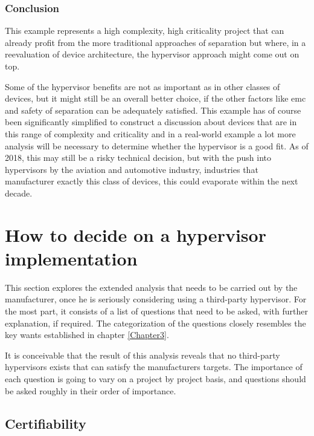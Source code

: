 \subsubsection{Conclusion}
This example represents a high complexity, high criticality project that can already profit from the more traditional approaches of separation but where, in a reevaluation of device architecture, the hypervisor approach might come out on top. 

Some of the hypervisor benefits are not as important as in other classes of devices, but it might still be an overall better choice, if the other factors like \acrshort{emc} and safety of separation can be adequately satisfied. This example has of course been significantly simplified to construct a discussion about devices that are in this range of complexity and criticality and in a real-world example a lot more analysis will be necessary to determine whether the hypervisor is a good fit. As of 2018, this may still be a risky technical decision, but with the push into hypervisors by the aviation and automotive industry, industries that manufacturer exactly this class of devices, this could evaporate within the next decade.


\section{How to decide on a hypervisor implementation} \label{how-to-decide}
This section explores the extended analysis that needs to be carried out by the manufacturer, once he is seriously considering using a third-party hypervisor. For the most part, it consists of a list of questions that need to be asked, with further explanation, if required. The categorization of the questions closely resembles the key wants established in chapter \ref{Chapter3}.

It is conceivable that the result of this analysis reveals that no third-party hypervisors exists that can satisfy the manufacturers targets. The importance of each question is going to vary on a project by project basis, and questions should be asked roughly in their order of importance. 

\subsection{Certifiability}
